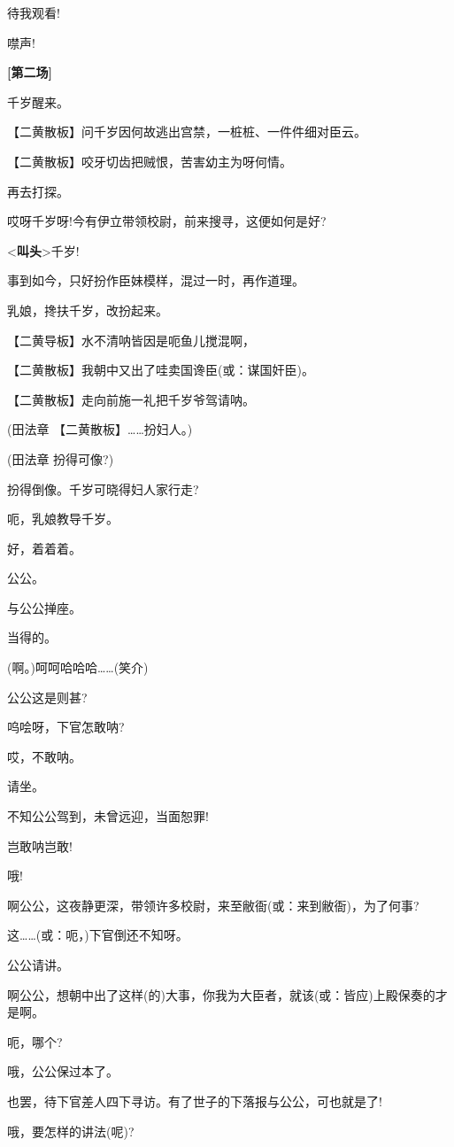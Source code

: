 待我观看!

噤声!

\textbf{{[}第二场{]}}

千岁醒来。

【二黄散板】问千岁因何故逃出宫禁，一桩桩、一件件细对臣云。

【二黄散板】咬牙切齿把贼恨，苦害幼主为呀何情。

再去打探。

哎呀千岁呀!今有伊立带领校尉，前来搜寻，这便如何是好?

\textless{}\textbf{叫头}\textgreater{}千岁!

事到如今，只好扮作臣妹模样，混过一时，再作道理。

乳娘，搀扶千岁，改扮起来。

【二黄导板】水不清呐皆因是呃鱼儿搅混啊，

【二黄散板】我朝中又出了哇卖国谗臣(或：谋国奸臣)。

【二黄散板】走向前施一礼把千岁爷驾请呐。

(田法章 【二黄散板】\ldots{}\ldots{}扮妇人。)

(田法章 扮得可像?)

扮得倒像。千岁可晓得妇人家行走?

呃，乳娘教导千岁。

好，着着着。

公公。

与公公掸座。

当得的。

(啊。)呵呵哈哈哈\ldots{}\ldots{}(笑介)

公公这是则甚?

呜哙呀，下官怎敢呐?

哎，不敢呐。

请坐。

不知公公驾到，未曾远迎，当面恕罪!

岂敢呐岂敢!

哦!

啊公公，这夜静更深，带领许多校尉，来至敝衙(或：来到敝衙)，为了何事?

这\ldots{}\ldots{}(或：呃，)下官倒还不知呀。

公公请讲。

啊公公，想朝中出了这样(的)大事，你我为大臣者，就该(或：皆应)上殿保奏的才是啊。

呃，哪个?

哦，公公保过本了。

也罢，待下官差人四下寻访。有了世子的下落报与公公，可也就是了!

哦，要怎样的讲法(呢)?

